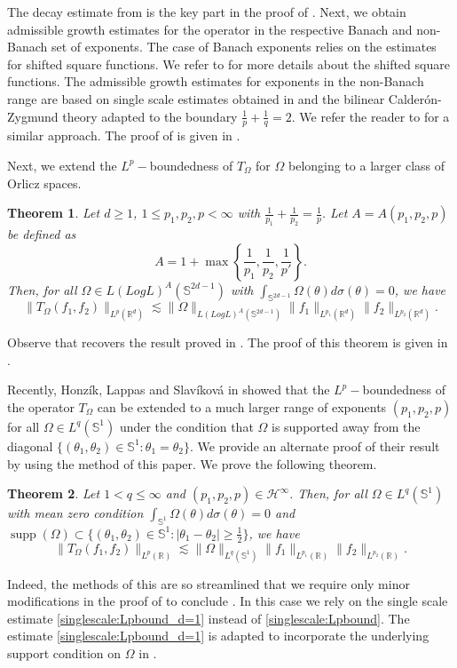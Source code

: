 \documentclass[a4paper,reqno]{amsart}
\newcommand{\R}{{\mathbb R}}       %
\newcommand{\Sp}{{\mathbb S}}
\newcommand{\supp}[1]{\operatorname{supp}(#1)}   %
\newtheorem{theorem}{Theorem}[section]
\theoremstyle{definition}
\numberwithin{equation}{section}
\begin{document}
The decay estimate from  is the key part in the proof of . Next, we obtain  admissible growth estimates for the operator in the respective Banach and non-Banach set of exponents. The case of Banach exponents relies on the estimates for shifted square functions. We refer to \cite{DosidisSlavikova} for more details about the shifted square functions. The admissible growth estimates for exponents in the non-Banach range are based on single scale estimates obtained in  and the bilinear Calder\'on-Zygmund theory adapted to the boundary $\frac{1}{p}+\frac{1}{q}=2$. We refer the reader to \cite{ChristZhou,HP2023} for a similar approach. The proof of  is given in .

Next, we extend the $L^p-$boundedness of $T_\Omega$ for $\Omega$ belonging to a larger class of Orlicz spaces.  
\begin{theorem}\label{Thm:RoughBanach}
	Let $d\geq1$, $1\leq p_1,p_2,p<\infty$ with $\frac{1}{p_1}+\frac{1}{p_2}=\frac{1}{p}$. Let $A=A(p_1,p_2,p)$ be defined as
	\[A=1+\max\left\{\frac{1}{p_1},\frac{1}{p_2},\frac{1}{p'}\right\}.\]
	Then, for all $\Omega\in L(LogL)^A(\Sp^{2d-1})$ with $\int_{\Sp^{2d-1}}\Omega(\theta) d\sigma(\theta)=0$, we have
	\[\|T_\Omega(f_1,f_2)\|_{L^{p}(\R^d)}\lesssim\|\Omega\|_{L(LogL)^A(\Sp^{2d-1})}\|f_1\|_{L^{p_1}(\R^d)}\|f_2\|_{L^{p_2}(\R^d)}.\]
\end{theorem}
Observe that  recovers the result proved in \cite{DPS2024}. The proof of this theorem is given in .

Recently, Honz\'ik, Lappas and Slav\'ikov\'a in \cite{HLS2025} showed that the $L^p-$boundedness of the operator $T_\Omega$  can be extended to a much larger range of exponents $(p_1,p_2,p)$ for all $\Omega\in L^q(\Sp^1)$ under the condition that $\Omega$ is supported away from the diagonal $\{(\theta_1,\theta_2)\in\Sp^1:\theta_1=\theta_2\}$. We provide an alternate proof of their result by using the method of this paper. We prove the following theorem. 
\begin{theorem}\label{Thm:Roughantidiag}
	Let $1<q\leq\infty$ and $(p_1,p_2,p)\in\mathcal{H}^\infty$. Then, for all $\Omega\in L^q(\Sp^1)$ with mean zero condition $\int_{\Sp^{1}}\Omega(\theta) d\sigma(\theta)=0$ and $\supp{\Omega}\subset \{(\theta_1,\theta_2)\in\Sp^1:|\theta_1-\theta_2|\geq\frac{1}{2}\}$, we have  
	\[\|T_\Omega(f_1,f_2)\|_{L^p(\R)}\lesssim\|\Omega\|_{L^q(\Sp^{1})}\|f_1\|_{L^{p_1}(\R)}\|f_2\|_{L^{p_2}(\R)}.\]
\end{theorem}
 Indeed, the methods of this are so streamlined that we require only minor modifications in the proof of  to conclude . In this case we rely on the single scale estimate \eqref{singlescale:Lpbound_d=1} instead of \eqref{singlescale:Lpbound}. The estimate  \eqref{singlescale:Lpbound_d=1} is adapted to incorporate the underlying support condition on $\Omega$ in . 
\end{document}
